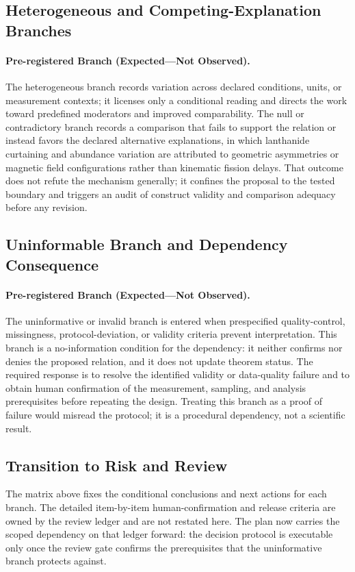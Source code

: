 \documentclass[conference]{IEEEtran}
\begin{document}
\subsection{Heterogeneous and Competing-Explanation Branches}
\paragraph{Pre-registered Branch (Expected---Not Observed).} The heterogeneous branch records variation across declared conditions, units, or measurement contexts; it licenses only a conditional reading and directs the work toward predefined moderators and improved comparability. The null or contradictory branch records a comparison that fails to support the relation or instead favors the declared alternative explanations, in which lanthanide curtaining and abundance variation are attributed to geometric asymmetries or magnetic field configurations rather than kinematic fission delays. That outcome does not refute the mechanism generally; it confines the proposal to the tested boundary and triggers an audit of construct validity and comparison adequacy before any revision.

\subsection{Uninformable Branch and Dependency Consequence}
\paragraph{Pre-registered Branch (Expected---Not Observed).} The uninformative or invalid branch is entered when prespecified quality-control, missingness, protocol-deviation, or validity criteria prevent interpretation. This branch is a no-information condition for the dependency: it neither confirms nor denies the proposed relation, and it does not update theorem status. The required response is to resolve the identified validity or data-quality failure and to obtain human confirmation of the measurement, sampling, and analysis prerequisites before repeating the design. Treating this branch as a proof of failure would misread the protocol; it is a procedural dependency, not a scientific result.

\subsection{Transition to Risk and Review}
The matrix above fixes the conditional conclusions and next actions for each branch. The detailed item-by-item human-confirmation and release criteria are owned by the review ledger and are not restated here. The plan now carries the scoped dependency on that ledger forward: the decision protocol is executable only once the review gate confirms the prerequisites that the uninformative branch protects against.
\end{document}
